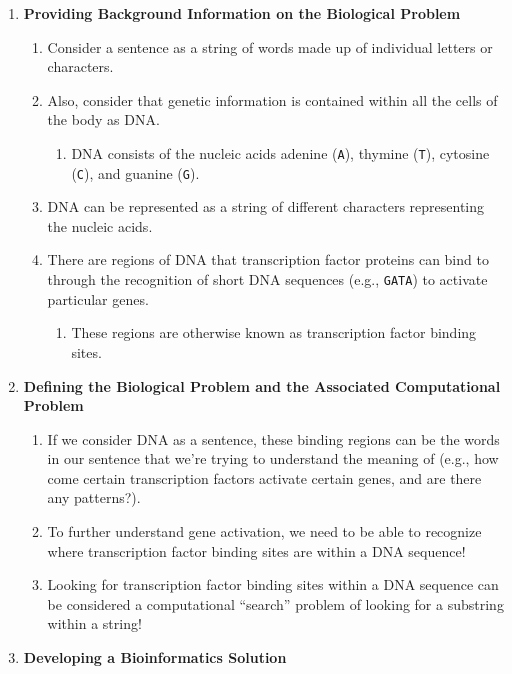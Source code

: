 \begin{enumerate}
    \item \textbf{Providing Background Information on the Biological Problem}
    \begin{enumerate}
        \item Consider a sentence as a string of words made up of individual letters or characters. 
        \item Also, consider that genetic information is contained within all the cells of the body as DNA.
        \begin{enumerate}
            \item DNA consists of the nucleic acids adenine (\verb|A|), thymine (\verb|T|), cytosine (\verb|C|), and guanine (\verb|G|).
        \end{enumerate}
        \item DNA can be represented as a string of different characters representing the nucleic acids.  
        \item There are regions of DNA that transcription factor proteins can bind to through the recognition of short DNA sequences (e.g., \verb|GATA|) to activate particular genes.
        \begin{enumerate}
            \item These regions are otherwise known as transcription factor binding sites.
        \end{enumerate}
    \end{enumerate}
    \item \textbf{Defining the Biological Problem and the Associated Computational Problem}
    \begin{enumerate}
        \item If we consider DNA as a sentence, these binding regions can be the words in our sentence that we're trying to understand the meaning of (e.g., how come certain transcription factors activate certain genes, and are there any patterns?). 
        \item To further understand gene activation, we need to be able to recognize where transcription factor binding sites are within a DNA sequence!
        \item Looking for transcription factor binding sites within a DNA sequence can be considered a computational “search” problem of looking for a substring within a string! 
    \end{enumerate}
    \item \textbf{Developing a Bioinformatics Solution}
    \begin{enumerate}

\end{enumerate}
\end{enumerate}
